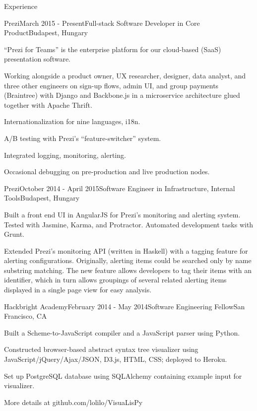 \documentclass{resume} %
\begin{document}
\begin{rSection}{Experience}

\begin{rSubsection}{Prezi}{March 2015 - Present}{Full-stack Software Developer in Core Product}{Budapest, Hungary}
\item ``Prezi for Teams'' is the enterprise platform for our cloud-based (SaaS) presentation software.
\item Working alongside a product owner, UX researcher, designer, data analyst, and three other engineers on sign-up flows, admin UI, and group payments (Braintree) with Django and Backbone.js in a microservice architecture glued together with Apache Thrift.
\item Internationalization for nine languages, i18n.
\item A/B testing with Prezi's ``feature-switcher'' system.
\item Integrated logging, monitoring, alerting.
\item Occasional debugging on pre-production and live production nodes.
\end{rSubsection}


\begin{rSubsection}{Prezi}{October 2014 - April 2015}{Software Engineer in Infrastructure, Internal Tools}{Budapest, Hungary}
\item Built a front end UI in AngularJS for Prezi’s monitoring and alerting system. Tested with Jasmine, Karma, and Protractor. Automated development tasks with Grunt.
\item Extended Prezi's monitoring API (written in Haskell) with a tagging feature for alerting configurations. Originally, alerting items could be searched only by name substring matching. The new feature allows developers to tag their items with an identifier, which in turn allows groupings of several related alerting items displayed in a single page view for easy analysis.
\end{rSubsection}


\begin{rSubsection}{Hackbright Academy}{February 2014 - May 2014}{Software Engineering Fellow}{San Francisco, CA}
\item Built a Scheme-to-JavaScript compiler and a JavaScript parser using Python.
\item Constructed browser-based abstract syntax tree visualizer using JavaScript/jQuery/Ajax/JSON, D3.js, HTML, CSS; deployed to Heroku.
\item Set up PostgreSQL database using SQLAlchemy containing example input for visualizer.
\item More details at github.com/lolilo/VisuaLisPy
\end{rSubsection}

\end{rSection}
\end{document}
